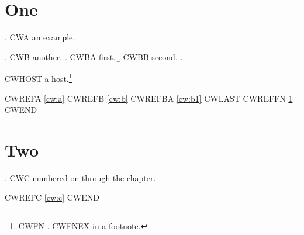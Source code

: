 \documentclass[11pt]{report}
\begin{document}
\chapter{One}
\ex. \label{cw:a} CWA an example.

\ex. \label{cw:b} CWB another.
\a. \label{cw:b1} CWBA first.
\b. CWBB second.
\z.

CWHOST a host.\footnote{CWFN \ex. \label{cw:fn} CWFNEX in a footnote.}

CWREFA \ref{cw:a} CWREFB \ref{cw:b} CWREFBA \ref{cw:b1} CWLAST \Last[a]
CWREFFN \ref{cw:fn} CWEND

\chapter{Two}
\ex. \label{cw:c} CWC numbered on through the chapter.

CWREFC \ref{cw:c} CWEND
\end{document}
